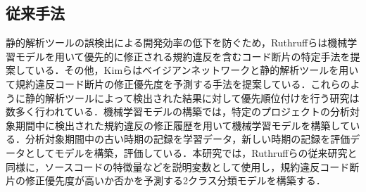 \documentclass[T,J]{fose} %
\begin{document}







\subsection{従来手法}
静的解析ツールの誤検出による開発効率の低下を防ぐため，Ruthruffらは機械学習モデルを用いて優先的に修正される規約違反を含むコード断片の特定手法を提案している\cite{JyuraiPre}．その他，Kimらはベイジアンネットワークと静的解析ツールを用いて規約違反コード断片の修正優先度を予測する手法を提案している\cite{beizu}．これらのように静的解析ツールによって検出された結果に対して優先順位付けを行う研究は数多く行われている\cite{Wang}\cite{Qing}\cite{HowFar}．機械学習モデルの構築では，特定のプロジェクトの分析対象期間中に検出された規約違反の修正履歴を用いて機械学習モデルを構築している．分析対象期間中の古い時期の記録を学習データ，新しい時期の記録を評価データとしてモデルを構築，評価している．本研究では，Ruthruffらの従来研究と同様に，ソースコードの特徴量などを説明変数として使用し，規約違反コード断片の修正優先度が高いか否かを予測する2クラス分類モデルを構築する．
\end{document}
